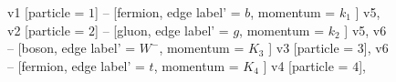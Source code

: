 \documentclass{revtex4}
\begin{document}
\begin{figure}[!htb]
\begin{center}
{    %
v1 [particle = \(1\)] -- [fermion, edge label' = \(b\), momentum = \(k_{1}\) ] v5, 
v2 [particle = \(2\)] -- [gluon, edge label' = \(g\), momentum = \(k_{2}\) ] v5, 
v6 -- [boson, edge label' = \(W^{-}\), momentum = \(K_{3}\) ] v3 [particle = \(3\)], 
v6 -- [fermion, edge label' = \(t\), momentum = \(K_{4}\) ] v4 [particle = \(4\)], 
}
\end{center}
\end{figure}
\end{document}
